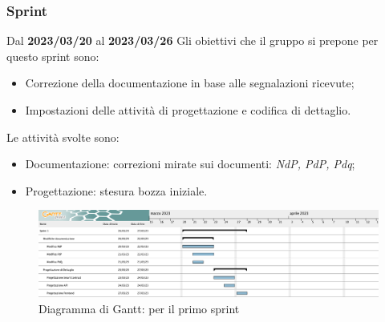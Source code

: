 \subsubsection{ Sprint}
Dal \textbf{2023/03/20} al \textbf{2023/03/26}
\newline
Gli obiettivi che il gruppo si prepone per questo sprint sono:
\begin{itemize}
    \item Correzione della documentazione in base alle segnalazioni ricevute;
    \item Impostazioni delle attività di progettazione e codifica di dettaglio.
\end{itemize}
Le attività svolte sono:
\begin{itemize}
    \item Documentazione: correzioni mirate sui documenti: \textit{NdP, PdP, Pdq};
    \item Progettazione: stesura bozza iniziale.
\end{itemize}
\begin{figure}[H]
    \centering
    \includegraphics[scale=0.32]{src/img/GanttSprint1.png}
    \caption{Diagramma di Gantt: per il primo sprint}
\end{figure}
